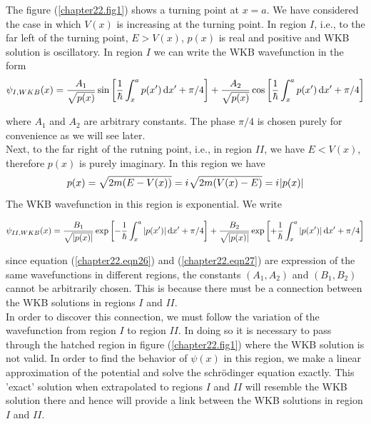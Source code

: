 The figure (\ref{chapter22.fig1}) shows a turning point at $x=a$. We have considered the case in which $V(x)$ is increasing at the turning point. In region $I$, i.e., to the far left of the turning point, $E > V(x)$, $p(x)$ is real and positive and WKB solution is oscillatory. In region $I$ we can write the WKB wavefunction in the form
\begin{equation}
	\label{chapter22.eqn26}
	\psi_{I,WKB}(x) = \frac{A_1}{\sqrt{p(x)}} \sin \qty[\frac{1}{\hbar} \int_{x}^{a} p(x^\prime) \dd{x^\prime} + \pi/4]  +  \frac{A_2}{\sqrt{p(x)}} \cos \qty[\frac{1}{\hbar} \int_{x}^{a} p(x^\prime) \dd{x^\prime} + \pi/4]
\end{equation}

where $A_1$ and $A_2$ are arbitrary constants. The phase $\pi/4$ is chosen purely for convenience as we will see later.\\

Next, to the far right of the rutning point, i.e., in region $II$, we have $E<V(x)$, therefore $p(x)$ is purely imaginary. In this region we have
\begin{equation}
p(x) = \sqrt{2 m \qty(E - V(x))} = {i\mkern1mu} \sqrt{2 m \qty(V(x) - E)} = {i\mkern1mu} \abs{p(x)}
\end{equation}
The WKB wavefunction in this region is exponential. We write

\begin{equation}
\label{chapter22.eqn27}
\psi_{II,WKB}(x) = \frac{B_1}{\sqrt{\abs{p(x)}}} \exp \qty[-\frac{1}{\hbar} \int_{x}^{a} \abs{p(x^\prime)} \dd{x^\prime} + \pi/4]  +  \frac{B_2}{\sqrt{\abs{p(x)}}} \exp \qty[+\frac{1}{\hbar} \int_{x}^{a} \abs{p(x^\prime)} \dd{x^\prime} + \pi/4]
\end{equation}

since equation (\ref{chapter22.eqn26}) and (\ref{chapter22.eqn27}) are expression of the same wavefunctions in different regions, the constants $(A_1, A_2)$ and $(B_1,B_2)$ cannot be arbitrarily chosen. This is because there must be a connection between the WKB solutions in regions $I$ and $II$.\\

In order to discover this connection, we must follow the variation of the wavefunction from region $I$ to region $II$. In doing so it is necessary to pass through the hatched region in figure (\ref{chapter22.fig1}) where the WKB solution is not valid. In order to find the behavior of $\psi(x)$ in this region, we make a linear approximation of the potential and solve the schr\"{o}dinger equation exactly. This 'exact' solution when extrapolated to regions $I$ and $II$ will resemble the WKB solution there and hence will provide a link between the WKB solutions in region $I$ and $II$.\\


